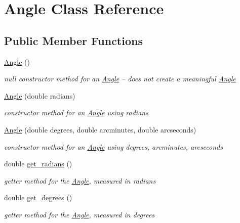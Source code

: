 \hypertarget{classAngle}{}\section{Angle Class Reference}
\label{classAngle}
\subsection*{Public Member Functions}
\begin{DoxyCompactItemize}
\item 
\mbox{\label{classAngle_aca3c6e1519b40835d31736430ca082a9}} 
\mbox{\hyperlink{classAngle_aca3c6e1519b40835d31736430ca082a9}{Angle}} ()
\begin{DoxyCompactList}\small\item\em null constructor method for an \mbox{\hyperlink{classAngle}{Angle}} -- does not create a meaningful \mbox{\hyperlink{classAngle}{Angle}} \end{DoxyCompactList}\item 
\mbox{\hyperlink{classAngle_a0c77cde78d872c2353b7b583e5928230}{Angle}} (double radians)
\begin{DoxyCompactList}\small\item\em constructor method for an \mbox{\hyperlink{classAngle}{Angle}} using radians \end{DoxyCompactList}\item 
\mbox{\hyperlink{classAngle_aaddbbb2df503cad123ceec60df3778d7}{Angle}} (double degrees, double arcminutes, double arcseconds)
\begin{DoxyCompactList}\small\item\em constructor method for an \mbox{\hyperlink{classAngle}{Angle}} using degrees, arcminutes, arcseconds \end{DoxyCompactList}\item 
double \mbox{\hyperlink{classAngle_af8f8715184904ea14d1e951be1f8d60c}{get\+\_\+radians}} ()
\begin{DoxyCompactList}\small\item\em getter method for the \mbox{\hyperlink{classAngle}{Angle}}, measured in radians \end{DoxyCompactList}\item 
double \mbox{\hyperlink{classAngle_a592d871a119dd6470e3af13e76debb07}{get\+\_\+degrees}} ()
\begin{DoxyCompactList}\small\item\em getter method for the \mbox{\hyperlink{classAngle}{Angle}}, measured in degrees \end{DoxyCompactList}\item 

\end{DoxyCompactItemize}
